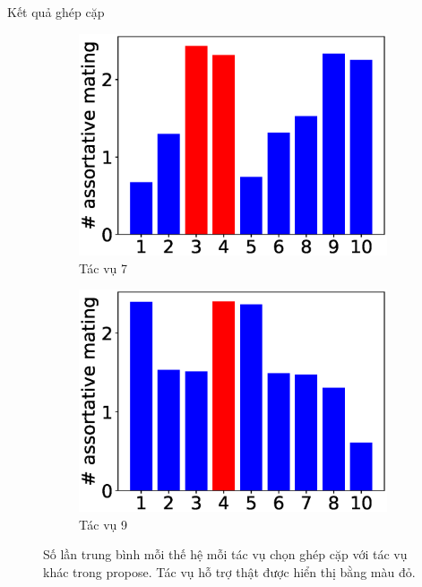 \begin{frame}{Kết quả ghép cặp}
\begin{figure}
            \hfill
            \begin{subfigure}[b]{0.245\linewidth}
                \centering
                \includegraphics[width=\linewidth]{figure/experiment/bar10/7.eps}
                \caption{Tác vụ 7}
                \label{fig:bar10-7}
            \end{subfigure}
            \hfill
            \begin{subfigure}[b]{0.245\linewidth}
                \centering
                \includegraphics[width=\linewidth]{figure/experiment/bar10/9.eps}
                \caption{Tác vụ 9}
                \label{fig:bar10-9}
            \end{subfigure}
            \hfill
            \caption{Số lần trung bình mỗi thế hệ mỗi tác vụ chọn ghép cặp với tác vụ khác trong \gls{propose}. Tác vụ hỗ trợ thật được hiển thị bằng màu đỏ.}
            \label{fig:result:count10}
        \end{figure}
    \end{frame}

